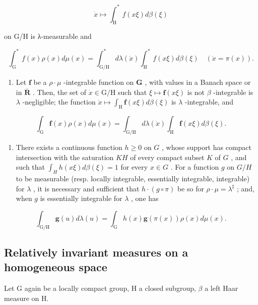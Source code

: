 \[
\dot {x} \mapsto \int_ {\mathrm{H}} ^ {*} f (x \xi) d \beta (\xi)
\]

on G/H is λ-measurable and

\[
\int_ {\mathrm{G}} ^ {*} f (x) \rho (x) d \mu (x) = \int_ {\mathrm{G} / \mathrm{H}} ^ {*} d \lambda (\dot {x}) \int_ {\mathrm{H}} ^ {*} f (x \xi) d \beta (\xi) \quad (\dot {x} = \pi (x)).
\]

\begin{enumerate}
\def\labelenumi{\alph{enumi})}
\setcounter{enumi}{2}
\tightlist
\item
  Let \(\mathbf{f}\) be a \(\rho \cdot \mu\) -integrable function on \(\mathbf{G}\) , with values in a Banach space or in \(\overline{\mathbf{R}}\) . Then, the set of \(\dot{x} \in \mathrm{G} / \mathrm{H}\) such that \(\xi \mapsto \mathbf{f}(x\xi)\) is not \(\beta\) -integrable is \(\lambda\) -negligible; the function \(\dot{x} \mapsto \int_{\mathrm{H}} \mathbf{f}(x\xi) d\beta(\xi)\) is \(\lambda\) -integrable, and
\end{enumerate}

\[
\int_ {\mathrm{G}} \mathbf {f} (x) \rho (x) d \mu (x) = \int_ {\mathrm{G/H}} d \lambda (\dot {x}) \int_ {\mathrm{H}} \mathbf {f} (x \xi) d \beta (\xi).
\]

\begin{enumerate}
\def\labelenumi{\alph{enumi})}
\setcounter{enumi}{3}
\tightlist
\item
  There exists a continuous function \(h \geqslant 0\) on \(G\) , whose support has compact intersection with the saturation \(KH\) of every compact subset \(K\) of \(G\) , and such that \(\int_{H} h(x\xi) d\beta(\xi) = 1\) for every \(x \in G\) . For a function \(g\) on \(G/H\) to be measurable (resp. locally integrable, essentially integrable, integrable) for \(\lambda\) , it is necessary and sufficient that \(h \cdot (g \circ \pi)\) be so for \(\rho \cdot \mu = \lambda^{\sharp}\) ; and, when \(g\) is essentially integrable for \(\lambda\) , one has
\end{enumerate}

\[
\int_ {\mathrm{G/H}} \mathbf {g} (u) d \lambda (u) = \int_ {\mathrm{G}} h (x) \mathbf {g} (\pi (x)) \rho (x) d \mu (x).
\]

\subsection{Relatively invariant measures on a homogeneous space}

Let G again be a locally compact group, H a closed subgroup, \(\beta\) a left Haar measure on H.


